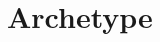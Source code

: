 \begin{comment}
Documents for this task come from a corpus of 162,048 full-text biomedical
articles. If you want to estimate the size of the corpus, 12.3 GB (uncompressed)
and 3 GB (standard compressed). Each document is identified by its PMID
(PubMed\footnote{\url{http://www.ncbi.nlm.nih.gov/pubmed}} ID). Postprocessing
is done to eliminate as much non-article material as we could from the original
HTML formats Legal spans are defined as any text > 0 bytes in length between an
HTML paragraph tag, which is any tag that starts with \verb|<p| or \verb|</p|.

Similar to what you will be asked by the BioCreative competition organizer, you
are required to follow an output format for the retrieved relevant passages. The
format for TREC Genomics complies with standard TREC output format: a tabular
format that consists seven fields: topic number, doc ID (PubMedID), rank, score,
passage start, passage length, run tag.

The evaluation for the relevant passage retrieval is measured with a variant of
mean average precision (MAP). Three different levels will be applied to the
final result:
passage-level, document-level and aspect-level. In addition to the passage-level
evaluation, document-level captures the coverage of different relevant
documents, and aspect-level evaluation captures the coverage of different MeSH
terms\footnote{\url{http://www.ncbi.nlm.nih.gov/mesh}}.
\end{comment}
\section{Archetype}
